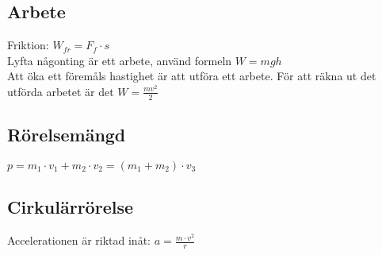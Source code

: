 \subsection{Arbete}
Friktion: 
\begin{math}
    W_{fr} = F_f \cdot s
\end{math} \\[2pt]

Lyfta någonting är ett arbete, använd formeln 
\begin{math}
    W = mgh
\end{math} \\[2pt]
Att öka ett föremåls hastighet är att utföra ett arbete. För att räkna ut det utförda arbetet är det
\begin{math}
    W = \frac{mv^2}{2}
\end{math} \\[2pt]

\subsection{Rörelsemängd}
\begin{math}
    p = m_1 \cdot v_1 + m_2 \cdot v_2 = (m_1 + m_2) \cdot v_3
\end{math} \\[2pt]

\subsection{Cirkulärrörelse}
Accelerationen är riktad inåt:
\begin{math}
    a = \frac{m \cdot v^2}{r}
\end{math} \\[2pt]

